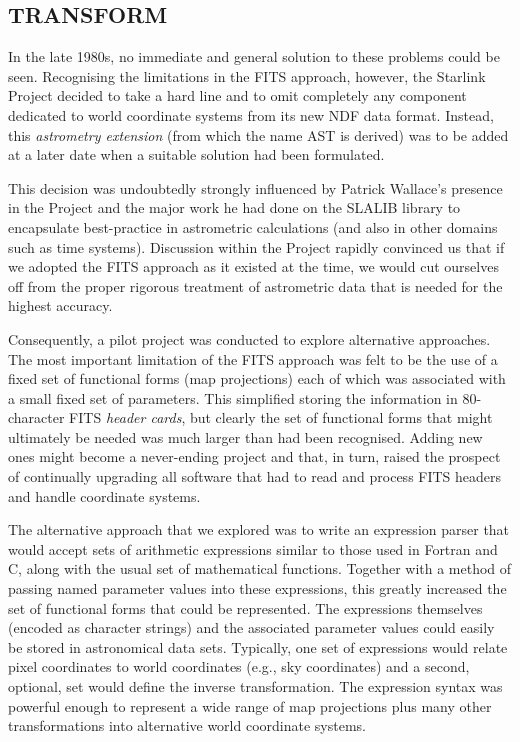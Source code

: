 \documentclass[final,authoryear,5p,times,twocolumn]{elsarticle}
\begin{document}
\subsection{TRANSFORM}

In the late 1980s, no immediate and general solution to these problems
could be seen. Recognising the limitations in the FITS approach,
however, the Starlink Project decided to take a hard line and to omit
completely any component dedicated to world coordinate systems from
its new NDF data format. Instead, this \emph{astrometry extension}
(from which the name AST is derived) was to be added at a later date
when a suitable solution had been formulated.

This decision was undoubtedly strongly influenced by Patrick Wallace's
presence in the Project and the major work he had done on the SLALIB
library \citep[][]{1994ASPC...61..481W} to encapsulate best-practice in
astrometric calculations (and also in other domains such as time
systems). Discussion within the Project rapidly convinced us that if
we adopted the FITS approach as it existed at the time, we would cut
ourselves off from the proper rigorous treatment of astrometric data
that is needed for the highest accuracy.

Consequently, a pilot project was conducted to explore alternative
approaches. The most important limitation of the FITS approach was felt
to be the use of a fixed set of functional forms (map projections) each
of which was associated with a small fixed set of parameters. This
simplified storing the information in 80-character FITS \emph{header cards},
but clearly the set of functional forms that might ultimately be needed
was much larger than had been recognised. Adding new ones might become a
never-ending project and that, in turn, raised the prospect of
continually upgrading all software that had to read and process FITS
headers and handle coordinate systems.

The alternative approach that we explored was to write an expression
parser that would accept sets of arithmetic expressions similar to those
used in Fortran and C, along with the usual set of mathematical
functions. Together with a method of passing named parameter values into
these expressions, this greatly increased the set of functional forms
that could be represented. The expressions themselves (encoded as
character strings) and the associated parameter values could easily be
stored in astronomical data sets. Typically, one set of expressions would
relate pixel coordinates to world coordinates (e.g., sky coordinates) and
a second, optional, set would define the inverse transformation. The
expression syntax was powerful enough to represent a wide range of map
projections plus many other transformations into alternative world
coordinate systems.
\end{document}
